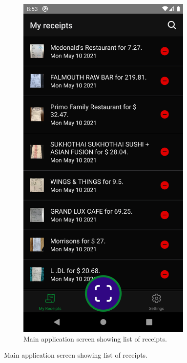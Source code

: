 \documentclass[
  digital, %
  table,   %
  oneside, %
  lof,     %
  lot,     %
]{fithesis3}
\begin{document}
\begin{figure}
    \centering
    \begin{subfigure}[t]{0.5\textwidth}
      \centering
      \includegraphics[width=0.95\textwidth]{figures/screens/android/dark/receipts_list}
      \caption{Main application screen showing list of receipts.}

\end{subfigure}
\end{figure}
\end{document}
